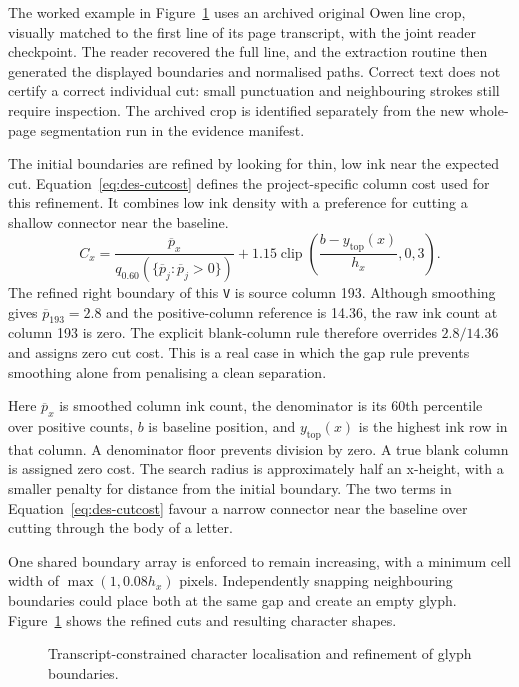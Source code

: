 The worked example in Figure~\ref{fig:des-alignment} uses an archived original Owen line crop, visually matched to the first line of its page transcript, with the joint reader checkpoint. The reader recovered the full line, and the extraction routine then generated the displayed boundaries and normalised paths. Correct text does not certify a correct individual cut: small punctuation and neighbouring strokes still require inspection. The archived crop is identified separately from the new whole-page segmentation run in the evidence manifest.

The initial boundaries are refined by looking for thin, low ink near the expected cut. Equation~\ref{eq:des-cutcost} defines the project-specific column cost used for this refinement. It combines low ink density with a preference for cutting a shallow connector near the baseline.
\begin{equation}
C_x=\frac{\overline p_x}{q_{0.60}(\{\overline p_j:\overline p_j>0\})}
+1.15\operatorname{clip}\left(\frac{b-y_{\mathrm{top}}(x)}{h_x},0,3\right).
\label{eq:des-cutcost}
\end{equation}
The refined right boundary of this \texttt{V} is source column 193. Although smoothing gives $\overline p_{193}=2.8$ and the positive-column reference is 14.36, the raw ink count at column 193 is zero. The explicit blank-column rule therefore overrides $2.8/14.36$ and assigns zero cut cost. This is a real case in which the gap rule prevents smoothing alone from penalising a clean separation.

Here $\overline p_x$ is smoothed column ink count, the denominator is its 60th percentile over positive counts, $b$ is baseline position, and $y_{\mathrm{top}}(x)$ is the highest ink row in that column. A denominator floor prevents division by zero. A true blank column is assigned zero cost. The search radius is approximately half an x-height, with a smaller penalty for distance from the initial boundary. The two terms in Equation~\ref{eq:des-cutcost} favour a narrow connector near the baseline over cutting through the body of a letter.

One shared boundary array is enforced to remain increasing, with a minimum cell width of $\max(1,0.08h_x)$ pixels. Independently snapping neighbouring boundaries could place both at the same gap and create an empty glyph. Figure~\ref{fig:des-alignment} shows the refined cuts and resulting character shapes.


\begin{figure}[!htbp]\centering
{}
\caption{Transcript-constrained character localisation and refinement of glyph boundaries.}
\label{fig:des-alignment}
\end{figure}

